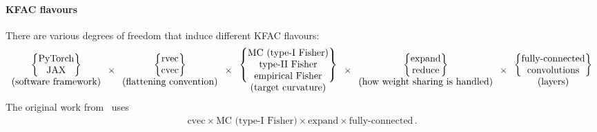 \paragraph{KFAC flavours} There are various degrees of freedom that induce different KFAC flavours:
\begin{align*}
  \begin{array}{c}
    \begin{Bmatrix}
      \text{PyTorch}
      \\
      \text{JAX}
    \end{Bmatrix}
    \\
    \text{(software framework)}
  \end{array}
  \times
  \begin{array}{c}
    \begin{Bmatrix}
      \operatorname{rvec}
      \\
      \operatorname{cvec}
    \end{Bmatrix}
    \\
    \text{(flattening convention)}
  \end{array}
  \times
  \begin{array}{c}
    \begin{Bmatrix}
      \text{MC (type-I Fisher)}
      \\
      \text{type-II Fisher}
      \\
      \text{empirical Fisher}
    \end{Bmatrix}
    \\
    \text{(target curvature)}
  \end{array}
  \times
  \begin{array}{c}
    \begin{Bmatrix}
      \text{expand}
      \\
      \text{reduce}
    \end{Bmatrix}
    \\
    \text{(how weight sharing is handled)}
  \end{array}
  \times
  \begin{array}{c}
    \begin{Bmatrix}
      \text{fully-connected}
      \\
      \text{convolutions}
    \end{Bmatrix}
    \\
    \text{(layers)}
  \end{array}
\end{align*}
The original work from~\citet{martens2015optimizing} uses
\begin{align*}
  \text{cvec} \times \text{MC (type-I Fisher)} \times \text{expand} \times \text{fully-connected}\,.
\end{align*}
